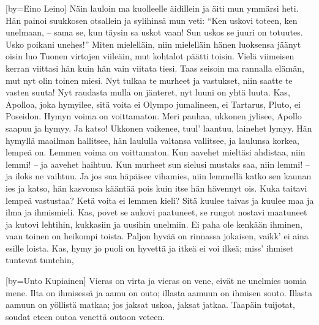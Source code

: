 [by={Eino Leino}]
  \beginverse
    Näin lauloin ma kuolleelle äidillein
    ja äiti mun ymmärsi heti.
    Hän painoi suukkosen otsallein
    ja sylihinsä mun veti:
    ``Ken uskovi toteen, ken unelmaan, --
    sama se, kun täysin sa uskot vaan!
    Sun uskos se juuri on totuutes.
    Usko poikani unehes!''
  \endverse
  \beginverse
    Miten mielelläin, niin mielelläin
    hänen luoksensa jäänyt oisin
    luo Tuonen virtojen viileäin,
    mut kohtalot päätti toisin.
    Vielä viimeisen kerran viittasi hän
    kuin hän vain viitata tiesi.
    Taas seisoin ma rannalla elämän,
    mut nyt olin toinen miesi.
  \endverse
  \beginverse
    Nyt tulkaa te murheet ja vastukset,
    niin saatte te vasten suuta!
    Nyt raudasta mulla on jänteret,
    nyt luuni on yhtä luuta.
    Kas, Apolloa, joka hymyilee,
    sitä voita ei Olympo jumalineen,
    ei Tartarus, Pluto, ei Poseidon.
    Hymyn voima on voittamaton.
  \endverse
  \beginverse
    Meri pauhaa, ukkonen jylisee,
    Apollo saapuu ja hymyy.
    Ja katso! Ukkonen vaikenee,
    tuul' laantuu, lainehet lymyy.
    Hän hymyllä maailman hallitsee,
    hän laululla valtansa vallitsee,
    ja laulunsa korkea, lempeä on.
    Lemmen voima on voittamaton.
  \endverse
  \beginverse
    Kun aavehet mieltäsi ahdistaa,
    niin lemmi! -- ja aavehet haihtuu.
    Kun murheet sun sielusi mustaks saa,
    niin lemmi! -- ja iloks ne vaihtuu.
    Ja jos sua häpäisee vihamies,
    niin lemmellä katko sen kaunan ies
    ja katso, hän kasvonsa kääntää pois
    kuin itse hän hävennyt ois.
  \endverse
  \beginverse
    Kuka taitavi lempeä vastustaa?
    Ketä voita ei lemmen kieli?
    Sitä kuulee taivas ja kuulee maa
    ja ilma ja ihmismieli.
    Kas, povet se aukovi paatuneet,
    se rungot nostavi maatuneet
    ja kutovi lehtihin, kukkasiin
    ja uusihin unelmiin.
  \endverse
  \beginverse
    Ei paha ole kenkään ihminen,
    vaan toinen on heikompi toista.
    Paljon hyvää on rinnassa jokaisen,
    vaikk' ei aina esille loista.
    Kas, hymy jo puoli on hyvettä
    ja itkeä ei voi ilkeä;
    miss' ihmiset tuntevat tuntehin,
  \endverse
\endsong


[by={Unto Kupiainen}]
  \beginverse
    Vieras on virta ja vieras on vene, 
    eivät ne unelmies uomia mene. 
    Ilta on ihmisessä ja aamu on outo; 
    illasta aamuun on ihmisen souto. 
    Illasta aamuun on yöllistä matkaa; 
    jos jaksat uskoa, jaksat jatkaa. 
    Taapäin tuijotat, soudat eteen 
    outoa venettä outoon veteen. 
  \endverse
\endsong

